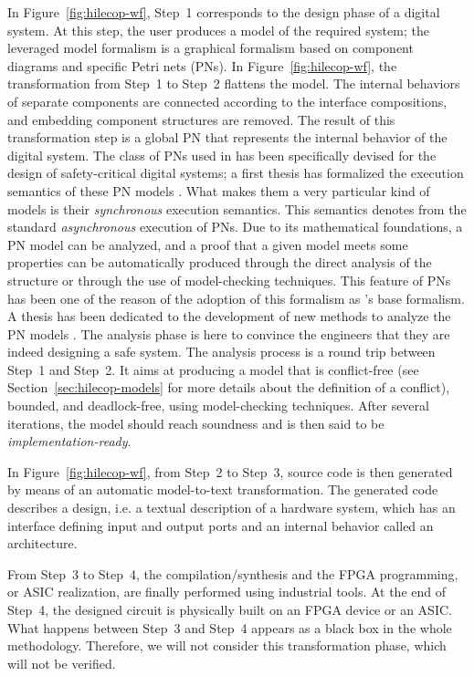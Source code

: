 \documentclass[pdflatex,sn-mathphys]{sn-jnl}%
\theoremstyle{thmstyleone}%
\theoremstyle{thmstyletwo}%
\theoremstyle{thmstylethree}%
\begin{document}
In Figure~\ref{fig:hilecop-wf}, Step~1 corresponds to the design phase
of a digital system. At this step, the user produces a model of the
required system; the leveraged model formalism is a graphical
formalism based on component diagrams and specific Petri nets (PNs).
In Figure~\ref{fig:hilecop-wf}, the transformation from Step~1 to
Step~2 flattens the model. The internal behaviors of separate
components are connected according to the interface compositions, and
embedding component structures are removed. The result of this
transformation step is a global PN that represents the internal
behavior of the digital system.  The class of PNs used in \hilecop{}
has been specifically devised for the design of safety-critical
digital systems; a first thesis has formalized the execution semantics
of these PN models \cite{Leroux2014}. What makes them a very
particular kind of models is their \textit{synchronous} execution
semantics. This semantics denotes from the standard
\textit{asynchronous} execution of PNs.  Due to its mathematical
foundations, a PN model can be analyzed, and a proof that a given
model meets some properties can be automatically produced through the
direct analysis of the structure or through the use of model-checking
techniques. This feature of PNs has been one of the reason of the
adoption of this formalism as \hilecop{}'s base formalism. A thesis
has been dedicated to the development of new methods to analyze the
\hilecop{} PN models \cite{Merzoug2018}. The analysis phase is here to
convince the engineers that they are indeed designing a safe
system. The analysis process is a round trip between Step~1 and
Step~2.  It aims at producing a model that is conflict-free (see
Section~\ref{sec:hilecop-models} for more details about the definition
of a conflict), bounded, and deadlock-free, using model-checking
techniques.  After several iterations, the model should reach
soundness and is then said to be \emph{implementation-ready}.

In Figure~\ref{fig:hilecop-wf}, from Step~2 to Step~3, \vhdl{} source
code is then generated by means of an automatic model-to-text
transformation. The generated code describes a \vhdl{} design, i.e. a
textual description of a hardware system, which has an interface
defining input and output ports and an internal behavior called an
architecture.

From Step~3 to Step~4, the \vhdl{} compilation/synthesis and the FPGA
programming, or ASIC realization, are finally performed using
industrial tools. At the end of Step~4, the designed circuit is
physically built on an FPGA device or an ASIC.  What happens between
Step~3 and Step~4 appears as a black box in the whole \hilecop{}
methodology. Therefore, we will not consider this transformation
phase, which will not be verified.
\end{document}
